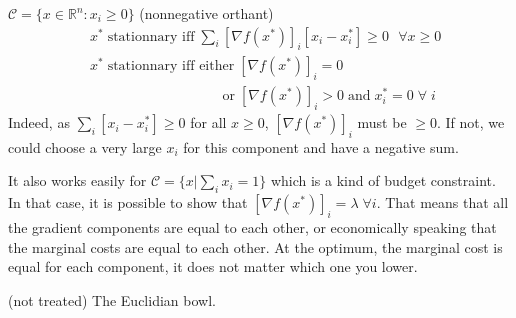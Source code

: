 \begin{example}
\begin{leftbar}
 $\mathcal{C} = \{x \in \mathbb{R}^n: x_i \ge 0\}$ (nonnegative orthant)
\begin{align*}
&x^* \; \text{stationnary iff} \; \sum_i \left[\nabla f(x^*)\right]_i \left[x_i - x_i^*\right] \ge 0\ \ \ \forall x\ge 0\\
&x^* \; \text{stationnary iff either} \; [\nabla f(x^*)]_i=0\\ 
&\phantom{x^* \; \text{stationnary iff eith}}\text{or} \; [\nabla f(x^*)]_i>0 \; \text{and} \; x_i^*=0 \; \forall \; i
\end{align*}
Indeed, as $\sum_i [x_i - x_i^*] \ge 0$ for all $x\ge0$,  $[\nabla f(x^*)]_i$ must be $\ge 0$.
If not, we could choose a very large $x_i$ for this component and have a negative sum.
\end{leftbar}
\end{example}

\begin{example}
\begin{leftbar}
It also works easily for $\mathcal{C} = \{x|\sum_{i}x_i=1\}$ which is a kind of budget constraint. In that case, it is possible to show that $[\nabla f(x^*)]_i = \lambda \; \forall i$. That means that all the gradient components are equal to each other, or economically speaking that the marginal costs are equal to each other. At the optimum, the marginal cost is equal for each component, it does not matter which one you lower.
\end{leftbar}
\end{example}

\begin{example}
\begin{leftbar}
(not treated) The Euclidian bowl.
\end{leftbar}
\end{example}




